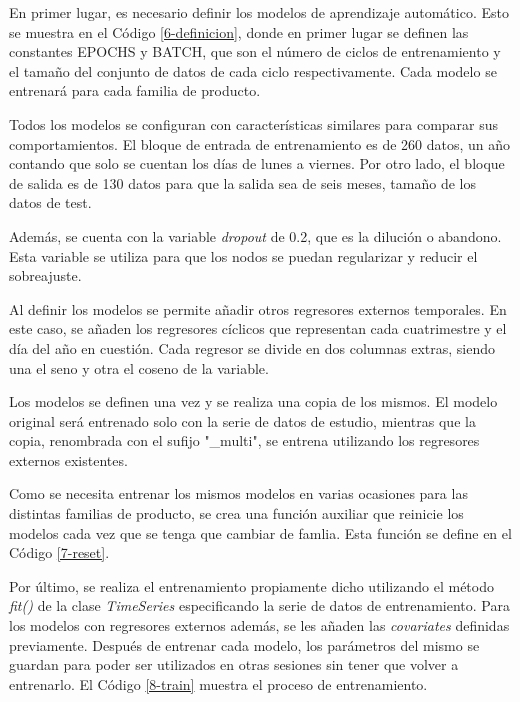 En primer lugar, es necesario definir los modelos de aprendizaje automático. Esto se muestra en el Código \ref*{6-definicion}, donde en primer lugar se definen las constantes EPOCHS y BATCH, que son el número de ciclos de entrenamiento y el tamaño del conjunto de datos de cada ciclo respectivamente. Cada modelo se entrenará para cada familia de producto.

Todos los modelos se configuran con características similares para comparar sus comportamientos. El bloque de entrada de entrenamiento es de 260 datos, un año contando que solo se cuentan los días de lunes a viernes. Por otro lado, el bloque de salida es de 130 datos para que la salida sea de seis meses, tamaño de los datos de test. 

Además, se cuenta con la variable \textit{dropout} de 0.2, que es la dilución o abandono. Esta variable se utiliza para que los nodos se puedan regularizar y reducir el sobreajuste.

Al definir los modelos se permite añadir otros regresores externos temporales. En este caso, se añaden los regresores cíclicos que representan cada cuatrimestre y el día del año en cuestión. Cada regresor se divide en dos columnas extras, siendo una el seno y otra el coseno de la variable. 

Los modelos se definen una vez y se realiza una copia de los mismos. El modelo original será entrenado solo con la serie de datos de estudio, mientras que la copia, renombrada con el sufijo "\_multi", se entrena utilizando los regresores externos existentes.



Como se necesita entrenar los mismos modelos en varias ocasiones para las distintas familias de producto, se crea una función auxiliar que reinicie los modelos cada vez que se tenga que cambiar de famlia. Esta función se define en el Código \ref*{7-reset}.



Por último, se realiza el entrenamiento propiamente dicho utilizando el método \textit{fit()} de la clase \textit{TimeSeries} especificando la serie de datos de entrenamiento. Para los modelos con regresores externos además, se les añaden las \textit{covariates} definidas previamente. Después de entrenar cada modelo, los parámetros del mismo se guardan para poder ser utilizados en otras sesiones sin tener que volver a entrenarlo. El Código \ref{8-train} muestra el proceso de entrenamiento. 

